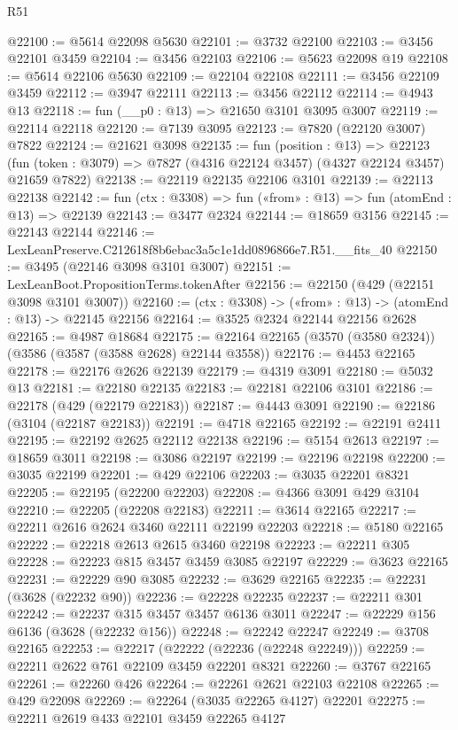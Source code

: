 \begin{lexlean}{R51}
\begin{coremodule}
@22100 := @5614 @22098 @5630
@22101 := @3732 @22100
@22103 := @3456 @22101 @3459
@22104 := @3456 @22103
@22106 := @5623 @22098 @19
@22108 := @5614 @22106 @5630
@22109 := @22104 @22108
@22111 := @3456 @22109 @3459
@22112 := @3947 @22111
@22113 := @3456 @22112
@22114 := @4943 @13
@22118 := fun (__p0 : @13) => @21650 @3101 @3095 @3007
@22119 := @22114 @22118
@22120 := @7139 @3095
@22123 := @7820 (@22120 @3007) @7822
@22124 := @21621 @3098
@22135 := fun (position : @13) =>
  @22123 (fun (token : @3079) => @7827 (@4316 @22124 @3457) (@4327 @22124 @3457) @21659 @7822)
@22138 := @22119 @22135 @22106 @3101
@22139 := @22113 @22138
@22142 := fun (ctx : @3308) => fun («from» : @13) => fun (atomEnd : @13) => @22139
@22143 := @3477 @2324
@22144 := @18659 @3156
@22145 := @22143 @22144
@22146 := LexLeanPreserve.C212618f8b6ebac3a5c1e1dd0896866e7.R51.__fits_40
@22150 := @3495 (@22146 @3098 @3101 @3007)
@22151 := LexLeanBoot.PropositionTerms.tokenAfter
@22156 := @22150 (@429 (@22151 @3098 @3101 @3007))
@22160 := (ctx : @3308) -> («from» : @13) -> (atomEnd : @13) -> @22145 @22156
@22164 := @3525 @2324 @22144 @22156 @2628
@22165 := @4987 @18684
@22175 := @22164 @22165 (@3570 (@3580 @2324)) (@3586 (@3587 (@3588 @2628) @22144 @3558))
@22176 := @4453 @22165
@22178 := @22176 @2626 @22139
@22179 := @4319 @3091
@22180 := @5032 @13
@22181 := @22180 @22135
@22183 := @22181 @22106 @3101
@22186 := @22178 (@429 (@22179 @22183))
@22187 := @4443 @3091
@22190 := @22186 (@3104 (@22187 @22183))
@22191 := @4718 @22165
@22192 := @22191 @2411
@22195 := @22192 @2625 @22112 @22138
@22196 := @5154 @2613
@22197 := @18659 @3011
@22198 := @3086 @22197
@22199 := @22196 @22198
@22200 := @3035 @22199
@22201 := @429 @22106
@22203 := @3035 @22201 @8321
@22205 := @22195 (@22200 @22203)
@22208 := @4366 @3091 @429 @3104
@22210 := @22205 (@22208 @22183)
@22211 := @3614 @22165
@22217 := @22211 @2616 @2624 @3460 @22111 @22199 @22203
@22218 := @5180 @22165
@22222 := @22218 @2613 @2615 @3460 @22198
@22223 := @22211 @305
@22228 := @22223 @815 @3457 @3459 @3085 @22197
@22229 := @3623 @22165
@22231 := @22229 @90 @3085
@22232 := @3629 @22165
@22235 := @22231 (@3628 (@22232 @90))
@22236 := @22228 @22235
@22237 := @22211 @301
@22242 := @22237 @315 @3457 @3457 @6136 @3011
@22247 := @22229 @156 @6136 (@3628 (@22232 @156))
@22248 := @22242 @22247
@22249 := @3708 @22165
@22253 := @22217 (@22222 (@22236 (@22248 @22249)))
@22259 := @22211 @2622 @761 @22109 @3459 @22201 @8321
@22260 := @3767 @22165
@22261 := @22260 @426
@22264 := @22261 @2621 @22103 @22108
@22265 := @429 @22098
@22269 := @22264 (@3035 @22265 @4127) @22201
@22275 := @22211 @2619 @433 @22101 @3459 @22265 @4127

\end{coremodule}
\end{lexlean}
